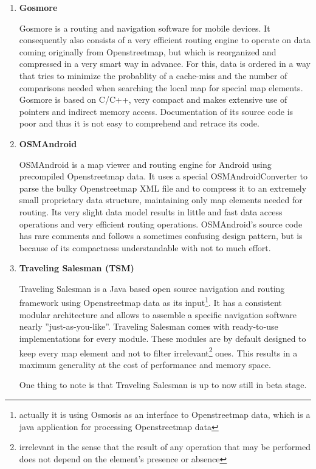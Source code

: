 \begin{enumerate}

	\item \textbf{Gosmore}
	
		Gosmore is a routing and navigation software for mobile devices. It consequently also consists of a very efficient routing engine to operate on data coming originally from Openstreetmap, but which is reorganized and compressed in a very smart way in advance. For this, data is ordered in a way that tries to minimize the probablity of a cache-miss and the number of comparisons needed when searching the local map for special map elements.
		Gosmore is based on C/C++, very compact and makes extensive use of pointers and indirect memory access. Documentation of its source code is poor and thus it is not easy to comprehend and retrace its code.
	
	\item \textbf{OSMAndroid}
	
		OSMAndroid is a map viewer and routing engine for Android using precompiled Openstreetmap data. It uses a special OSMAndroidConverter to parse the bulky Openstreetmap XML file and to compress it to an extremely small 	proprietary data structure, maintaining only map elements needed for routing. Its very slight data model results in little and fast data access operations and very efficient routing operations.
		OSMAndroid's source code has rare comments and follows a sometimes confusing design pattern, but is because of its compactness understandable with not to much effort.
	
	\item \textbf{Traveling Salesman (TSM)}
	
		Traveling Salesman is a Java based open source navigation and routing framework using Openstreetmap data as its input\footnote{actually it is using Osmosis as an interface to Openstreetmap data, which is a java application for processing Openstreetmap data}. It has a consistent modular architecture and allows to assemble a specific navigation software nearly ''just-as-you-like''. Traveling Salesman comes with ready-to-use implementations for every module. These modules are by default designed to keep every map element and not to filter irrelevant\footnote{irrelevant in the sense that the result of any operation that may be performed does not depend on the element's presence or absence} ones. This results in a maximum generality at the cost of performance and memory space.\newline
		
		One thing to note is that Traveling Salesman is up to now still in beta stage.

\end{enumerate}

